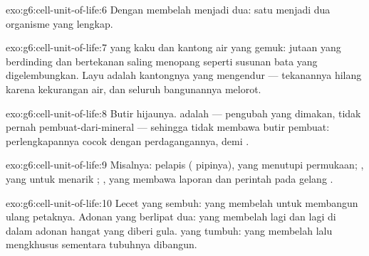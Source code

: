 \begin{solution}{exo:g6:cell-unit-of-life:6}
Dengan membelah menjadi dua: satu  menjadi dua organisme yang
lengkap.
\end{solution}

\begin{solution}{exo:g6:cell-unit-of-life:7}
 yang kaku dan kantong air yang gemuk: jutaan  yang
berdinding dan bertekanan saling menopang seperti susunan bata yang
digelembungkan. Layu adalah kantongnya yang mengendur --- tekanannya
hilang karena kekurangan air, dan seluruh bangunannya melorot.
\end{solution}

\begin{solution}{exo:g6:cell-unit-of-life:8}
Butir hijaunya.  adalah  --- pengubah  yang
dimakan, tidak pernah pembuat-dari-mineral --- sehingga  tidak
membawa butir pembuat: perlengkapannya cocok dengan perdagangannya,
 demi .
\end{solution}

\begin{solution}{exo:g6:cell-unit-of-life:9}
Misalnya:  pelapis ( pipinya), yang menutupi permukaan; 
, yang  untuk menarik ;  , yang membawa
laporan dan perintah pada gelang .
\end{solution}

\begin{solution}{exo:g6:cell-unit-of-life:10}
Lecet yang sembuh:   yang membelah untuk membangun ulang
petaknya. Adonan yang berlipat dua:   yang membelah lagi dan
lagi di dalam adonan hangat yang diberi gula.  yang tumbuh:
 yang membelah lalu mengkhusus sementara tubuhnya dibangun.
\end{solution}

